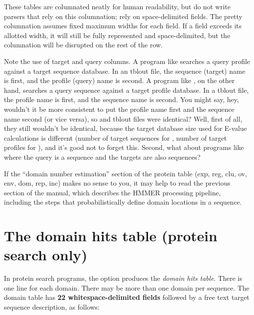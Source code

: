 These tables are columnated neatly for human readability, but do not
write parsers that rely on this columnation; rely on space-delimited
fields. The pretty columnation assumes fixed maximum widths for each
field. If a field exceeds its allotted width, it will still be fully
represented and space-delimited, but the columnation will be disrupted
on the rest of the row.

Note the use of target and query columns. A program like
 searches a query profile against a target sequence
database. In an  tblout file, the sequence (target)
name is first, and the profile (query) name is second. A program like
, on the other hand, searches a query sequence against a
target profile database. In a  tblout file, the profile
name is first, and the sequence name is second. You might say, hey,
wouldn't it be more consistent to put the profile name first and the
sequence name second (or vice versa), so  and
 tblout files were identical? Well, first of all, they
still wouldn't be identical, because the target database size used for
E-value calculations is different (number of target sequences for
, number of target profiles for ), and
  it's good not to forget this. Second, what about programs like
   where the query is a sequence and the targets are also
  sequences?

If the ``domain number estimation'' section of the protein table (exp, reg,
clu, ov, env, dom, rep, inc) makes no sense to you, it may help to
read the previous section of the manual, which describes the HMMER
processing pipeline, including the steps that probabilistically define
domain locations in a sequence.

\section{The domain hits table (protein search only)}

In protein search programs, the  option produces the
\emph{domain hits table}. There is one line for each domain. There may be more than
one domain per sequence. The domain table has \textbf{22
  whitespace-delimited fields} followed by a free text target sequence
description, as follows:

